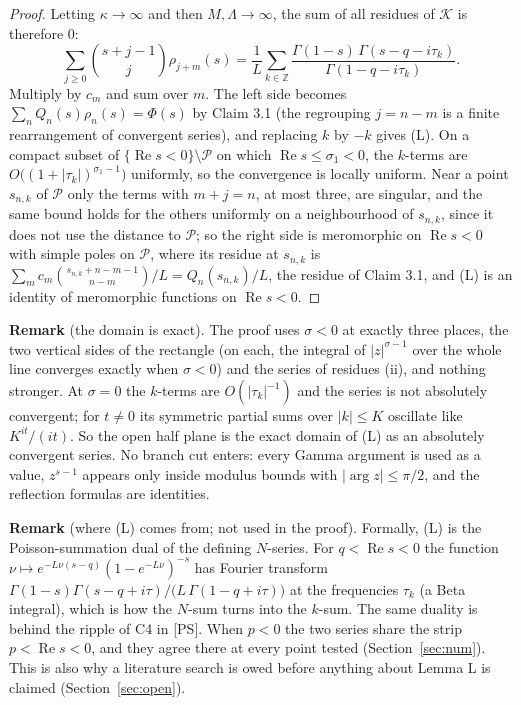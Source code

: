 \documentclass[11pt]{article}
\newcommand{\re}{\operatorname{Re}}
\begin{document}
\begin{proof}
Letting $\kappa\to\infty$ and then $M,\Lambda\to\infty$, the sum of all residues of $\mathcal{K}$ is therefore $0$:
\[
\sum_{j\ge0}\binom{s+j-1}{j}\rho_{j+m}(s)=\frac1L\sum_{k\in\mathbb{Z}}\frac{\Gamma(1-s)\,\Gamma(s-q-i\tau_k)}{\Gamma(1-q-i\tau_k)}.
\]
Multiply by $c_m$ and sum over $m$. The left side becomes $\sum_nQ_n(s)\rho_n(s)=\Phi(s)$ by Claim 3.1 (the regrouping $j=n-m$ is a finite rearrangement of convergent series), and replacing $k$ by $-k$ gives (L). On a compact subset of $\{\re s<0\}\setminus\mathcal{P}$ on which $\re s\le\sigma_1<0$, the $k$-terms are $O\bigl((1+|\tau_k|)^{\sigma_1-1}\bigr)$ uniformly, so the convergence is locally uniform. Near a point $s_{n,k}$ of $\mathcal{P}$ only the terms with $m+j=n$, at most three, are singular, and the same bound holds for the others uniformly on a neighbourhood of $s_{n,k}$, since it does not use the distance to $\mathcal{P}$; so the right side is meromorphic on $\re s<0$ with simple poles on $\mathcal{P}$, where its residue at $s_{n,k}$ is $\sum_mc_m\binom{s_{n,k}+n-m-1}{n-m}/L=Q_n(s_{n,k})/L$, the residue of Claim 3.1, and (L) is an identity of meromorphic functions on $\re s<0$.
\end{proof}

\noindent\textbf{Remark} (the domain is exact). The proof uses $\sigma<0$ at exactly three places, the two vertical sides of the rectangle (on each, the integral of $|z|^{\sigma-1}$ over the whole line converges exactly when $\sigma<0$) and the series of residues (ii), and nothing stronger. At $\sigma=0$ the $k$-terms are $O(|\tau_k|^{-1})$ and the series is not absolutely convergent; for $t\ne0$ its symmetric partial sums over $|k|\le K$ oscillate like $K^{it}/(it)$. So the open half plane is the exact domain of (L) as an absolutely convergent series. No branch cut enters: every Gamma argument is used as a value, $z^{s-1}$ appears only inside modulus bounds with $|\arg z|\le\pi/2$, and the reflection formulas are identities.

\medskip
\noindent\textbf{Remark} (where (L) comes from; not used in the proof). Formally, (L) is the Poisson-summation dual of the defining $N$-series. For $q<\re s<0$ the function $\nu\mapsto e^{-L\nu(s-q)}(1-e^{-L\nu})^{-s}$ has Fourier transform $\Gamma(1-s)\Gamma(s-q+i\tau)/\bigl(L\,\Gamma(1-q+i\tau)\bigr)$ at the frequencies $\tau_k$ (a Beta integral), which is how the $N$-sum turns into the $k$-sum. The same duality is behind the ripple of C4 in [PS]. When $p<0$ the two series share the strip $p<\re s<0$, and they agree there at every point tested (Section~\ref{sec:num}). This is also why a literature search is owed before anything about Lemma L is claimed (Section~\ref{sec:open}).
\end{document}
